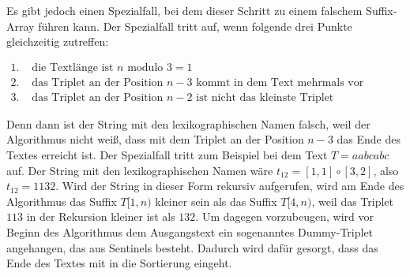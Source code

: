 Es gibt jedoch einen Spezialfall, bei dem dieser Schritt zu einem falschem Suffix-Array führen kann. Der Spezialfall tritt auf, wenn folgende drei Punkte gleichzeitig zutreffen:

$\begin{array}{ll}
1. & \text{ die Textlänge ist } n \text{ modulo } 3 = 1\\ 
2. & \text{ das Triplet an der Position } n - 3 \text{ kommt in dem Text mehrmals vor}\\ 
3. & \text{ das Triplet an der Position } n - 2 \text{ ist nicht das kleinste Triplet}
\end{array}$

Denn dann ist der String mit den lexikographischen Namen falsch, weil der Algorithmus nicht weiß, dass mit dem Triplet an der Position $n - 3$ das Ende des Textes erreicht ist.
Der Spezialfall tritt zum Beispiel bei dem Text $T = aabcabc$ auf. Der String mit den lexikographischen Namen wäre $t_{12} = [1, 1] \circ [3, 2]$, also $t_{12} = 1132$. Wird der String in dieser Form rekursiv aufgerufen, wird am Ende des Algorithmus das Suffix $T[1, n)$ kleiner sein als das Suffix $T[4, n)$, weil das Triplet $113$ in der Rekursion kleiner ist als $132$. Um dagegen vorzubeugen, wird vor Beginn des Algorithmus dem Ausgangstext ein sogenanntes Dummy-Triplet angehangen, das aus Sentinels besteht. Dadurch wird dafür gesorgt, dass das Ende des Textes mit in die Sortierung eingeht.